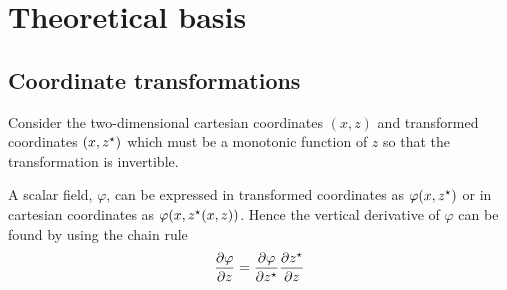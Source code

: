 \chapter{Theoretical basis}

\section{Coordinate transformations}
\label{sec:theory:coord-transform}

Consider the two-dimensional cartesian coordinates $(x, z)$ and transformed coordinates $(x, {z^\star})$ which must be a monotonic function of $z$ so that the transformation is invertible.

A scalar field, $\varphi$, can be expressed in transformed coordinates as $\varphi(x, {z^\star})$ or in cartesian coordinates as $\varphi(x, {z^\star}(x, z))$.
Hence the vertical derivative of $\varphi$ can be found by using the chain rule \autocite{mit2004}
\begin{align}
  \frac{\partial \varphi}{\partial z} =
  \frac{\partial \varphi}{\partial {z^\star}}
  \frac{\partial {z^\star}}{\partial z} \label{eqn:theory:grad-transform}
\end{align}


